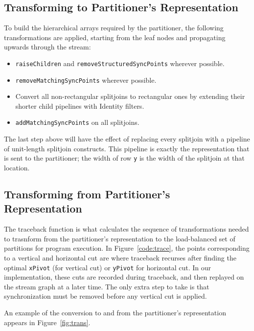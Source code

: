 \subsection{Transforming to Partitioner's Representation}

To build the hierarchical arrays required by the partitioner, the
following transformations are applied, starting from the leaf nodes
and propagating upwards through the stream:
\begin{itemize}

\item {\tt raiseChildren} and {\tt removeStructuredSyncPoints}
wherever possible.

\item {\tt removeMatchingSyncPoints} wherever possible.

\item Convert all non-rectangular splitjoins to rectangular ones by
extending their shorter child pipelines with Identity filters.

\item {\tt addMatchingSyncPoints} on all splitjoins.
\end{itemize}

The last step above will have the effect of replacing every splitjoin
with a pipeline of unit-length splitjoin constructs.  This pipeline is
exactly the representation that is sent to the partitioner; the width
of row {\tt y} is the width of the splitjoin at that location.  

\subsection{Transforming from Partitioner's Representation}

The traceback function is what calculates the sequence of
transformations needed to trasnform from the partitioner's
representation to the load-balanced set of partitions for program
execution.  In Figure~\ref{code:trace}, the points corresponding to a
vertical and horizontal cut are where traceback recurses after finding
the optimal {\tt xPivot} (for vertical cut) or {\tt yPivot} for
horizontal cut.  In our implementation, these cuts are recorded during
traceback, and then replayed on the stream graph at a later time.  The
only extra step to take is that synchronization must be removed before
any vertical cut is applied.

An example of the conversion to and from the partitioner's
representation appears in Figure~\ref{fig:trans}.

